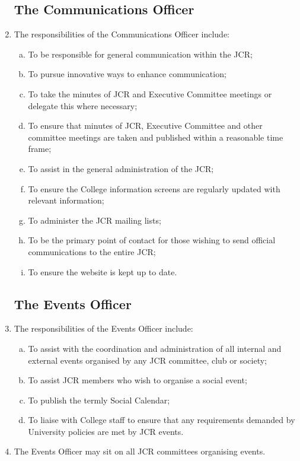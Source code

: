 \documentclass[12pt]{article}  %
\begin{document}
\begin{enumerate}
	\subsection{The Communications Officer}
	\item The responsibilities of the Communications Officer include:
	\begin{enumerate}[(a)]
		\item To be responsible for general communication within the JCR;
		\item To pursue innovative ways to enhance communication;
		\item To take the minutes of JCR and Executive Committee meetings or delegate this where necessary;
		\item To ensure that minutes of JCR, Executive Committee and other committee meetings are taken and published within a reasonable time frame;
		\item To assist in the general administration of the JCR;
		\item To ensure the College information screens are regularly updated with relevant information;
		\item To administer the JCR mailing lists;
		\item To be the primary point of contact for those wishing to send official communications to the entire JCR;
		\item To ensure the website is kept up to date.
	\end{enumerate}
	\subsection{The Events Officer}
	\item The responsibilities of the Events Officer include:
	\begin{enumerate}[(a)]
		\item To assist with the coordination and administration of all internal and external events organised by any JCR committee, club or society;
		\item To assist JCR members who wish to organise a social event;
		\item To publish the termly Social Calendar;
		\item To liaise with College staff to ensure that any requirements demanded by University policies are met by JCR events.
	\end{enumerate}
	\item The Events Officer may sit on all JCR committees organising events.

\end{enumerate}
\end{document}
